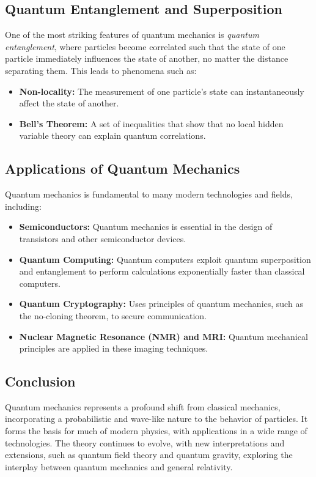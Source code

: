 \subsection{Quantum Entanglement and Superposition}
One of the most striking features of quantum mechanics is \textit{quantum entanglement}, where particles become correlated such that the state of one particle immediately influences the state of another, no matter the distance separating them. This leads to phenomena such as:
\begin{itemize}
    \item \textbf{Non-locality:} The measurement of one particle's state can instantaneously affect the state of another.
    \item \textbf{Bell's Theorem:} A set of inequalities that show that no local hidden variable theory can explain quantum correlations.
\end{itemize}

\subsection{Applications of Quantum Mechanics}
Quantum mechanics is fundamental to many modern technologies and fields, including:
\begin{itemize}
    \item \textbf{Semiconductors:} Quantum mechanics is essential in the design of transistors and other semiconductor devices.
    \item \textbf{Quantum Computing:} Quantum computers exploit quantum superposition and entanglement to perform calculations exponentially faster than classical computers.
    \item \textbf{Quantum Cryptography:} Uses principles of quantum mechanics, such as the no-cloning theorem, to secure communication.
    \item \textbf{Nuclear Magnetic Resonance (NMR) and MRI:} Quantum mechanical principles are applied in these imaging techniques.
\end{itemize}

\subsection{Conclusion}
Quantum mechanics represents a profound shift from classical mechanics, incorporating a probabilistic and wave-like nature to the behavior of particles. It forms the basis for much of modern physics, with applications in a wide range of technologies. The theory continues to evolve, with new interpretations and extensions, such as quantum field theory and quantum gravity, exploring the interplay between quantum mechanics and general relativity.


